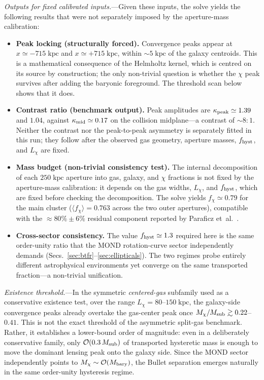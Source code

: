 \documentclass[11pt]{article}
\begin{document}
\textit{Outputs for fixed calibrated inputs.}---Given these inputs,
the solve yields the following results that were not separately imposed
by the aperture-mass calibration:
\begin{itemize}
  \item \textbf{Peak locking (structurally forced).}
    Convergence peaks appear at
    $x\simeq-715\;\mathrm{kpc}$ and
    $x\simeq+715\;\mathrm{kpc}$, within
    $\sim5\;\mathrm{kpc}$ of the galaxy centroids.
    This is a mathematical consequence of the Helmholtz
    kernel, which is centred on its source by construction;
    the only non-trivial question is whether the $\chi$
    peak survives after adding the baryonic foreground.
    The threshold scan below shows that it does.
  \item \textbf{Contrast ratio (benchmark output).}
    Peak amplitudes are $\kappa_{\rm peak}\simeq1.39$ and
    $1.04$, against $\kappa_{\rm mid}\simeq0.17$ on the
    collision midplane---a contrast of $\sim8{:}1$.
    Neither the contrast nor the peak-to-peak asymmetry is separately
    fitted in this run; they follow after the observed gas geometry,
    aperture masses, $f_{\rm hyst}$, and $L_\chi$ are fixed.
  \item \textbf{Mass budget (non-trivial consistency test).}
    The internal decomposition of each $250\;\mathrm{kpc}$
    aperture into gas, galaxy, and $\chi$ fractions is not
    fixed by the aperture-mass calibration: it depends on
    the gas widths, $L_\chi$, and $f_{\rm hyst}$, which are fixed
    before checking the decomposition.  The
    solve yields $f_\chi\simeq0.79$ for the main cluster
    ($\langle f_\chi\rangle=0.763$ across the two outer
    apertures), compatible with the
    $\approx80\%\pm6\%$ residual component reported by
    Paraficz et~al.~\cite{Paraficz2016}.
  \item \textbf{Cross-sector consistency.}
    The value $f_{\rm hyst}\simeq1.3$ required here is the
    same order-unity ratio that the MOND rotation-curve
    sector independently demands
    (Secs.~\ref{sec:btfr}--\ref{sec:ellipticals}).
    The two regimes probe entirely different astrophysical
    environments yet converge on the same transported
    fraction---a non-trivial unification.
\end{itemize}

\textit{Existence threshold.}---In the symmetric
\emph{centered-gas} subfamily used as a conservative
existence test, over the range
$L_\chi=80$--$150\;\mathrm{kpc}$, the galaxy-side
convergence peaks already overtake the gas-center peak once
$M_\chi/M_{\rm sub}\gtrsim0.22$--$0.41$.  This is not the
exact threshold of the asymmetric split-gas benchmark.
Rather, it establishes a lower-bound order of magnitude:
even in a deliberately conservative family, only
$\mathcal{O}(0.3\,M_{\rm sub})$ of transported hysteretic
mass is enough to move the dominant lensing peak onto the
galaxy side.  Since the MOND sector independently points to
$M_\chi\sim\mathcal{O}(M_{\rm bary})$, the Bullet separation
emerges naturally in the same order-unity hysteresis regime.
\end{document}
